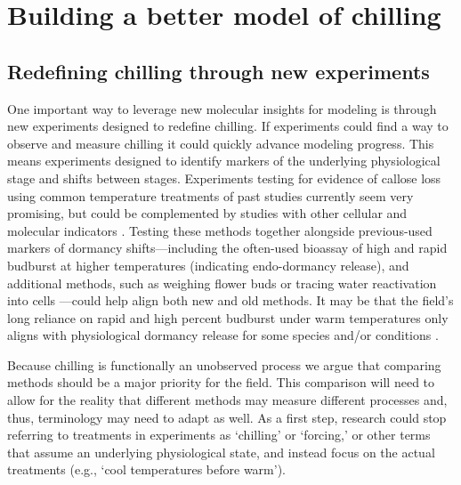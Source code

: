 \documentclass[11pt]{article}
\begin{document}
\section*{Building a better model of chilling} %

\subsection*{Redefining chilling through new experiments} 
One important way to leverage new molecular insights for modeling is through new experiments designed to redefine chilling. If experiments could find a way to observe and measure chilling it could quickly advance modeling progress. This means experiments  designed to identify markers of the underlying physiological stage and shifts between stages. Experiments testing for evidence of callose loss using common temperature treatments of past studies \citep{ospreebbms} currently seem very promising, but could be complemented by studies with other cellular and molecular indicators \citep{yu2024building}. Testing these methods together alongside previous-used markers of dormancy shifts---including the often-used bioassay of high and rapid budburst at higher temperatures (indicating endo-dormancy release), and additional methods, such as weighing flower buds \citep{chuine2016} or tracing water reactivation into cells \citep{faust1991bound,Kalcsits2009,walde2024stable}---could help align both new and old methods. It may be that the field's long reliance on rapid and high percent budburst under warm temperatures only aligns with physiological dormancy release for some species and/or conditions \citep{fouche2023transport,walde2024stable}. 

Because chilling is functionally an unobserved process we argue that comparing methods should be a major priority for the field. This comparison will need to allow for the reality that different methods may measure different processes and, thus, terminology may need to adapt as well. As a first step, research could stop referring to treatments in experiments as `chilling' or `forcing,' or other terms that assume an underlying physiological state, and instead focus on the actual treatments (e.g., `cool temperatures before warm'). 
\end{document}
